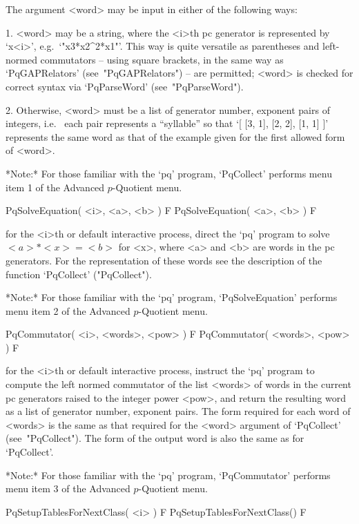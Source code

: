 The argument <word> may be input in either of the following ways:

\beginlist%

\item{1.}
<word> may be a string, where the <i>th pc generator  is  represented  by
`x<i>', e.g.~`"x3*x2^2*x1"'. This way is quite versatile  as  parentheses
and left-normed commutators -- using square brackets, in the same way  as
`PqGAPRelators' (see~"PqGAPRelators") -- are permitted; <word> is checked
for correct syntax via `PqParseWord' (see~"PqParseWord").

\item{2.}
Otherwise, <word> must be a list of generator number, exponent  pairs  of
integers, i.e.~ each pair represents a ``syllable'' so that  `[  [3,  1],
[2, 2], [1, 1] ]' represents the same word as that of the  example  given
for the first allowed form of <word>.

\endlist

*Note:* For those familiar with the  `pq'  program,  `PqCollect'  performs
menu item 1 of the Advanced $p$-Quotient menu.

\>PqSolveEquation( <i>, <a>, <b> ) F
\>PqSolveEquation( <a>, <b> ) F

for the  <i>th or default  interactive {\ANUPQ} process, direct  the `pq'
program to solve $<a>  * <x> = <b>$ for <x>, where  <a> and <b> are words
in the pc generators. For the  representation  of  these  words  see  the
description of the function `PqCollect' ("PqCollect").

*Note:* 
For those familiar  with  the  `pq'  program,  `PqSolveEquation'  performs
menu item 2 of the Advanced $p$-Quotient menu.

\>PqCommutator( <i>, <words>, <pow> ) F
\>PqCommutator( <words>, <pow> ) F

for the <i>th or default interactive {\ANUPQ} process, instruct the  `pq'
program to compute the left normed commutator  of  the  list  <words>  of
words in the current pc generators raised to the integer power <pow>, and
return the resulting word as a list of generator number, exponent  pairs.
The form required for each word of <words> is the same as  that  required
for the <word> argument of `PqCollect' (see~"PqCollect"). The form of the
output word is also the same as for `PqCollect'.

*Note:*
For those familiar with the `pq' program,  `PqCommutator'  performs  menu
item 3 of the Advanced $p$-Quotient menu.

\>PqSetupTablesForNextClass( <i> ) F
\>PqSetupTablesForNextClass() F

